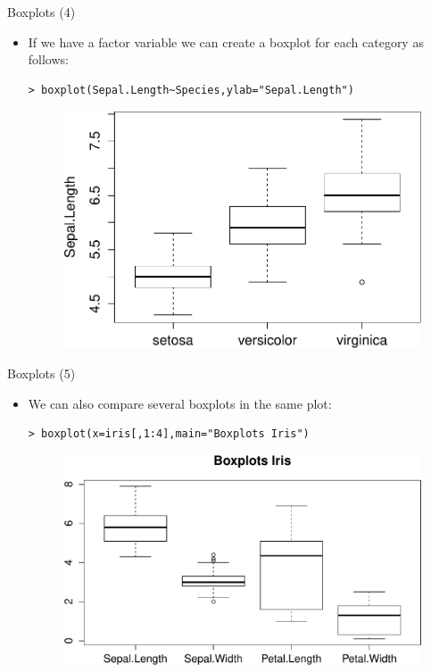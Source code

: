 \documentclass[handout]{beamer}
\begin{document}
\begin{frame}[fragile]{Boxplots (4)}
\scriptsize{
\begin{itemize}

\item If we have a factor variable we can create a boxplot for each category as follows:
\begin{verbatim}
> boxplot(Sepal.Length~Species,ylab="Sepal.Length")
\end{verbatim}

 \begin{figure}[h!]
	\centering
	\includegraphics[scale=0.5]{pics/boxplotfactor.pdf}		
\end{figure} 
 
\end{itemize}

}
\end{frame}
\begin{frame}[fragile]{Boxplots (5)}
\scriptsize{
\begin{itemize}

\item We can also compare several boxplots in the same plot:
\begin{verbatim}
> boxplot(x=iris[,1:4],main="Boxplots Iris")
\end{verbatim}

 \begin{figure}[h!]
	\centering
	\includegraphics[scale=0.5]{pics/boxplotiris.pdf}		
\end{figure} 
 
\end{itemize}

}
\end{frame}
\end{document}
